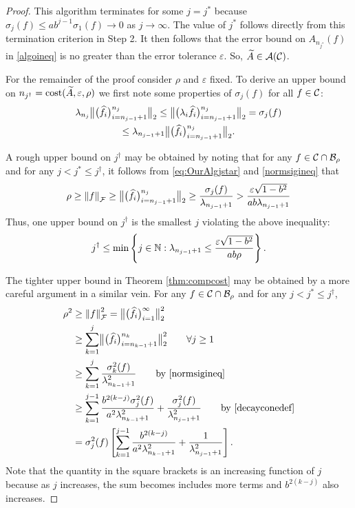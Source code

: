 \documentclass[final]{elsarticle}
\theoremstyle{definition}
\theoremstyle{remark}
\begin{document}
\begin{proof}
This algorithm terminates for some $j = j^*$ because $\sigma_j(f) \le ab^{j-1} \sigma_{1}(f) \to 0$ as $j \to \infty$. The value of $j^*$ follows directly from this termination criterion in Step 2.  It then follows that the error bound on $A_{n_{j^*}}(f)$ in \eqref{algoineq} is no greater than the error tolerance $\varepsilon$.  So, $\tA \in \ca(\cc)$.

For the remainder of the proof consider $\rho$ and $\varepsilon$ fixed.  To derive an upper bound on $n_{j^\dagger} = \cost(\tA,\varepsilon,\rho)$ we first note some properties of $\sigma_j(f)$ for all $f \in \cc$:
\begin{multline} \label{normsigineq}
\lambda_{n_j} \bignorm[2]{\big( \hf_i \big)_{i=n_{j-1}+1}^{n_j}} \le 
\bignorm[2]{\big( \lambda_i \hf_i \big)_{i=n_{j-1}+1}^{n_j}} = \sigma_j(f) 
\\
\le \lambda_{n_{j-1}+1} \bignorm[2]{\big( \hf_i \big)_{i=n_{j-1}+1}^{n_j}}.
\end{multline}

A rough upper bound on $j^\dagger$ may be obtained by noting that for any $f \in \cc \cap \cb_\rho$ and for any $j < j^* \le j^\dagger$, it follows from \eqref{eq:OurAlgjstar} and \eqref{normsigineq} that 
\begin{equation*}
\rho \ge \norm[\cf]{f} \ge \bignorm[2]{\big( \hf_i \big)_{i=n_{j-1}+1}^{n_j}} \ge \frac{\sigma_j(f)}{\lambda_{n_{j-1}+1}} > \frac{\varepsilon\sqrt{1 - b^2}}{ab \lambda_{n_{j-1}+1}}
\end{equation*}
Thus, one upper bound on $j^\dagger$ is the smallest $j$ violating the above inequality:
\begin{equation} \label{jdaggerlast}
j^\dagger \le \min \left \{j \in \naturals :  \lambda_{n_{j-1}+1} \le \frac{\varepsilon\sqrt{1 - b^2}}{ab \rho} \right\}.
\end{equation}

The tighter upper bound in Theorem \ref{thm:compcost} may be obtained by a more careful argument in a similar vein.  
For any $f \in  \cc \cap \cb_\rho$ and for any $j < j^* \le j^\dagger$,
\begin{align*}
\rho^2 &\ge \norm[\cf]{f}^2 = \bignorm[2]{\big( \hf_i \big)_{i=1}^{\infty}}^2 \\
& \ge \sum_{k=1}^j \bignorm[2]{\big( \hf_i \big)_{i=n_{k-1}+1}^{n_k}}^2 \qquad \forall j \ge 1\\
& \ge \sum_{k=1}^j \frac{\sigma_k^2(f)}{\lambda_{n_{k-1}+1}^2} \qquad \text{by \eqref{normsigineq}}\\
& \ge \sum_{k=1}^{j-1} \frac{ b^{2(k-j)}\sigma_j^2(f)}{a^{2}\lambda_{n_{k-1}+1}^2} + \frac{\sigma_j^2(f)}{\lambda_{n_{j-1}+1}^2} \qquad \text{by \eqref{decayconedef}} \\
& = \sigma_j^2(f) \left[ \sum_{k=1}^{j-1} \frac{b^{2(k-j)}}{a^{2} \lambda_{n_{k-1}+1}^2} + \frac{1}{\lambda_{n_{j-1}+1}^2}\right].
\end{align*}
Note that the quantity in the square brackets is an increasing function of $j$ because as $j$ increases, the sum becomes includes more terms and $b^{2(k-j)}$ also increases.


\end{proof}
\end{document}
